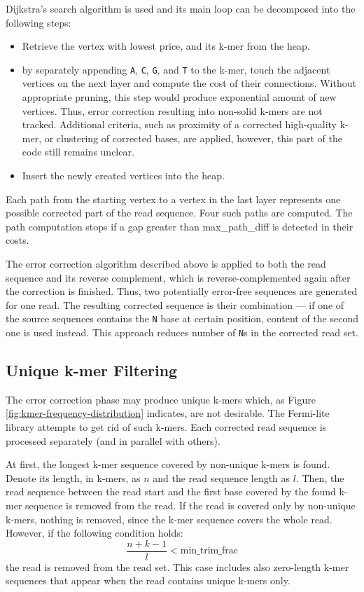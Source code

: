 Dijkstra's search algorithm is used and its main loop can be decomposed into the following steps:
\begin{itemize}
\item Retrieve the vertex with lowest price, and its k-mer from the heap.
\item by separately appending \texttt{A}, \texttt{C}, \texttt{G}, and \texttt{T} to the k-mer, touch the adjacent vertices on the next layer and compute the cost of their connections. Without appropriate pruning, this step would produce exponential amount of new vertices. Thus, error correction resulting into non-solid k-mers are not tracked. Additional criteria, such as proximity of a corrected high-quality k-mer, or clustering of corrected bases, are applied, however, this part of the code still remains unclear.
\item Insert the newly created vertices into the heap.
\end{itemize}

Each path from the starting vertex to a vertex in the last layer represents one possible corrected part of the read sequence. Four such paths are computed. The path computation stops if a gap greater than max\_path\_diff is detected in their costs.

The error correction algorithm described above is applied to both the read sequence and its reverse complement, which is reverse-complemented again after the correction is finished. Thus, two potentially error-free sequences are generated for one read. The resulting corrected sequence is their combination --- if one of the source sequences contains the \texttt{N} base at certain position, content of the second one is used instead. This approach reduces number of \texttt{N}s in the corrected read set.

\subsection{Unique k-mer Filtering}
\label{subsec:fermi-unique-kmer-filtering}

The error correction phase may produce unique k-mers which, as Figure \ref{fig:kmer-frequency-distribution} indicates, are not desirable. The Fermi-lite library attempts to get rid of such k-mers. Each corrected read sequence is processed separately (and in parallel with others). 

At first, the longest k-mer sequence covered by non-unique k-mers is found. Denote its length, in k-mers, as $n$ and the read sequence length as $l$. Then, the read sequence between the read start and the first base covered by the found k-mer sequence is removed from the read. If the read is covered only by non-unique k-mers, nothing is removed, since the k-mer sequence covers the whole read. However, if the following condition holds:
$$
\frac{n + k - 1}{l} < \text{min\_trim\_frac}
$$
the read is removed from the read set. This case includes also zero-length k-mer sequences that appear when the read contains unique k-mers only.